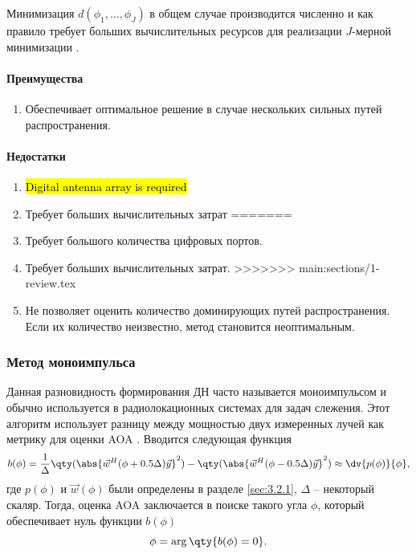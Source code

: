Минимизация $d(\phi_1, \hdots, \phi_J)$ в общем случае производится численно и
как правило требует больших вычислительных ресурсов для реализации $J$-мерной
минимизации \cite{Tuncer2009}. 


\paragraph{Преимущества}%
\begin{enumerate}
    \item Обеспечивает оптимальное решение в случае нескольких сильных путей распространения.
\end{enumerate}

\paragraph{Недостатки}%
\begin{enumerate}
<<<<<<< HEAD:sections/1-chapter-one.tex
    \item \hl{Digital antenna array is required}
    \item Требует больших вычислительных затрат
=======
    \item Требует большого количества цифровых портов.
    \item Требует больших вычислительных затрат.
>>>>>>> main:sections/1-review.tex
    \item Не позволяет оценить количество доминирующих путей распространения. Если их количество неизвестно, метод становится неоптимальным. 
\end{enumerate}

\subsubsection{Метод моноимпульса}%
\label{sub:monopulse}

Данная разновидность формирования ДН часто называется моноимпульсом и обычно 
используется в радиолокационных системах для задач слежения. 
Этот алгоритм использует разницу между мощностью двух измеренных лучей как метрику для 
оценки AOA \cite{Tuncer2009}. Вводится следующая функция 
\begin{equation}
    \label{eq:3.11}
    b(\phi) = \frac{1}{\Delta} \qty(\abs{\vec w^H(\phi+0.5 \Delta)\vec y}^2)
    -
    \qty(\abs{\vec w^H(\phi-0.5 \Delta)\vec y}^2) \approx \dv{p(\phi)}{\phi} ,
\end{equation}
где $p(\phi)$ и $\vec w(\phi)$ были определены в разделе \ref{sec:3.2.1}, $\Delta$ -- некоторый скаляр. Тогда, оценка AOA
заключается в поиске такого угла $\phi$, который обеспечивает нуль функции $b(\phi)$
\begin{equation}
    \label{eq:3.12}
    \phi = \arg\qty{b(\phi) = 0}.
\end{equation}

